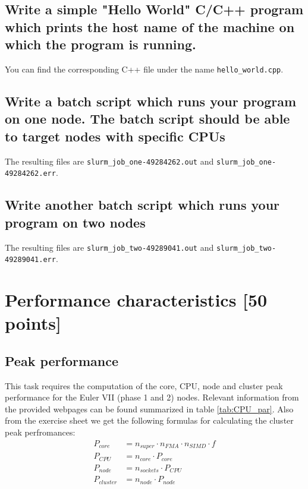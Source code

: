 \documentclass[unicode,11pt,a4paper,oneside,numbers=endperiod,openany]{scrartcl}
\begin{document}
\subsection{Write a simple "Hello World" C/C++ program which prints the host name of the machine
on which the program is running.}
You can find the corresponding C++ file under the name \texttt{hello\_world.cpp}.
\subsection{Write a batch script which runs your program on one node. The batch script should
be able to target nodes with specific CPUs}
The resulting files are \texttt{slurm\_job\_one-49284262.out} and \texttt{slurm\_job\_one-49284262.err}.
\subsection{Write another batch script which runs your program on two nodes}
The resulting files are \texttt{slurm\_job\_two-49289041.out} and \texttt{slurm\_job\_two-49289041.err}.

\section{Performance characteristics [50 points]}

\subsection{Peak performance}

This task requires the computation of the core, CPU, node and cluster peak performance for the Euler VII (phase 1 and 2) nodes. Relevant
information from the provided webpages can be found summarized in table \ref{tab:CPU_par}. Also from the exercise sheet we get the following
formulas for calculating the cluster peak perfromances:
\begin{align*}
    P_{core} &= n_{super} \cdot n_{FMA} \cdot n_{SIMD} \cdot f \\
    P_{CPU} &= n_{core} \cdot P_{core} \\
    P_{node} &= n_{sockets} \cdot P_{CPU} \\
    P_{cluster} &= n_{node} \cdot P_{node}
\end{align*}
\end{document}
